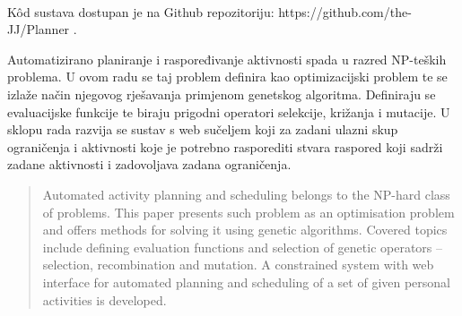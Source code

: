 \documentclass[times, utf8, zavrsni]{fer}
\begin{document}
\paragraph{}
K\^{o}d sustava dostupan je na Github repozitoriju: https://github.com/the-JJ/Planner .





\begin{sazetak}
Automatizirano planiranje i raspoređivanje aktivnosti spada u razred NP-teških problema. U ovom radu se taj problem definira kao optimizacijski problem te se izlaže način njegovog rješavanja primjenom genetskog algoritma. Definiraju se evaluacijske funkcije te biraju prigodni operatori selekcije, križanja i mutacije. U sklopu rada razvija se sustav s web sučeljem koji za zadani ulazni skup ograničenja i aktivnosti koje je potrebno rasporediti stvara raspored koji sadrži zadane aktivnosti i zadovoljava zadana ograničenja.

\end{sazetak}

\begin{abstract}
Automated activity planning and scheduling belongs to the NP-hard class of problems. This paper presents such problem as an optimisation problem and offers methods for solving it using genetic algorithms. Covered topics include defining evaluation functions and selection of genetic operators -- selection, recombination and mutation. A constrained system with web interface for automated planning and scheduling of a set of given personal activities is developed.

\end{abstract}
\end{document}
